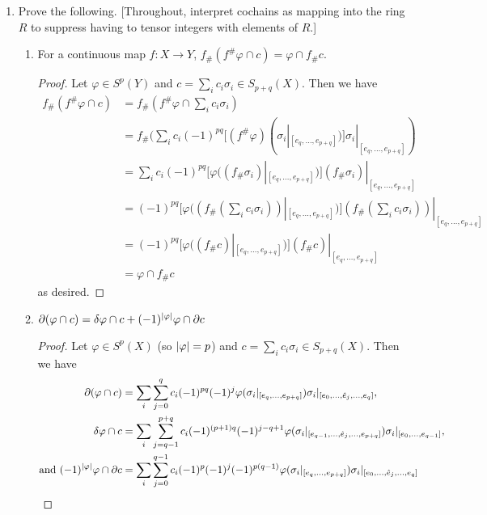 \documentclass[11pt]{article}
\begin{document}
\begin{enumerate}
    \item Prove the following. [Throughout, interpret cochains as mapping into the ring $R$ to suppress having to tensor integers with elements of $R$.]\begin{enumerate}
        \item For a continuous map $f\colon X\to Y$, $f_{\#}(f^{\#}\varphi\cap c) = \varphi\cap f_{\#}c$. \begin{proof}
          Let $\varphi\in S^p(Y)$ and $c = \sum_i c_i\sigma_i\in S_{p+q}(X)$. Then we have \begin{align*}
            f_{\#}(f^{\#}\varphi\cap c) &= f_{\#}(f^{\#}\varphi\cap \sum_i c_i\sigma_i)\\
            &=  f_{\#}(\sum_i c_i(-1)^{pq}[(f^{\#}\varphi)(\sigma_i|_{[e_q,\dots,e_{p+q}]})]\sigma_i|_{[e_q,\dots,e_{p+q}]})\\
            &=  \sum_i c_i(-1)^{pq}[\varphi((f_{\#}\sigma_i)|_{[e_q,\dots,e_{p+q}]})](f_{\#}\sigma_i)|_{[e_q,\dots,e_{p+q}]}\\ 
            &= (-1)^{pq}[\varphi((f_{\#}(\sum_i c_i\sigma_i))|_{[e_q,\dots,e_{p+q}]})](f_{\#}(\sum_i c_i\sigma_i))|_{[e_q,\dots,e_{p+q}]}\\
            &= (-1)^{pq}[\varphi((f_{\#}c)|_{[e_q,\dots,e_{p+q}]})](f_{\#}c)|_{[e_q,\dots,e_{p+q}]} \\ 
            &= \varphi\cap f_{\#}c
          \end{align*} as desired.
        \end{proof}
        \item $\partial(\varphi\cap c) = \delta\varphi\cap c + (-1)^{\abs{\varphi}}\varphi\cap \partial c$ \begin{proof}
          Let $\varphi\in S^p(X)$ (so $\abs{\varphi}=p$) and $c = \sum_i c_i\sigma_i\in S_{p+q}(X)$. Then we have \begin{align}
            \partial(\varphi\cap c) &= \sum_i\sum_{j=0}^q c_i(-1)^{pq}(-1)^j\varphi(\sigma_i|_{[e_q,\dots,e_{p+q}]})\sigma_i|_{[e_0,\dots,\hat e_j,\dots,e_q]},\\
            \delta \varphi\cap c &= \sum_i \sum_{j=q-1}^{p+q}c_i(-1)^{(p+1)q}(-1)^{j-q+1}\varphi(\sigma_i|_{[e_{q-1},\dots,\hat e_j,\dots,e_{p+q}]})\sigma_i|_{[e_0,\dots,e_{q-1}]},\\
            \text{and } (-1)^{\abs{\varphi}}\varphi\cap \partial c &= \sum_i\sum_{j=0}^{q-1}c_i(-1)^p(-1)^j(-1)^{p(q-1)}\varphi(\sigma_i|_{[e_q,\dots,e_{p+q}]})\sigma_i|_{[e_0,\dots,\hat e_j,\dots,e_q]} \\

\end{align}
\end{proof}
\end{enumerate}
\end{enumerate}
\end{document}
